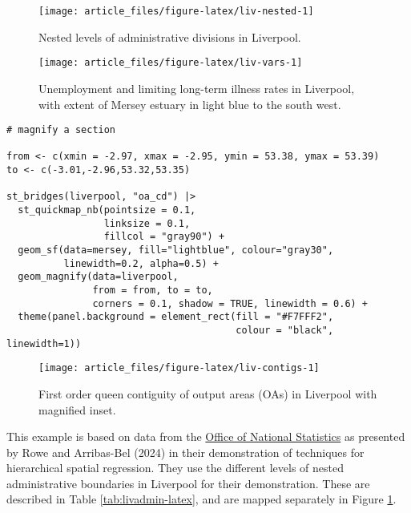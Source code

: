 \begin{figure}

{\centering \texttt{[image: article\_files/figure-latex/liv-nested-1]} 

}

\caption{Nested levels of administrative divisions in Liverpool. }\label{fig:liv-nested}
\end{figure}

\begin{figure}

{\centering \texttt{[image: article\_files/figure-latex/liv-vars-1]} 

}

\caption{Unemployment and limiting long-term illness rates in Liverpool, with extent of Mersey estuary in light blue to the south west. }\label{fig:liv-vars}
\end{figure}

\begin{verbatim}
# magnify a section

from <- c(xmin = -2.97, xmax = -2.95, ymin = 53.38, ymax = 53.39)
to <- c(-3.01,-2.96,53.32,53.35)

st_bridges(liverpool, "oa_cd") |> 
  st_quickmap_nb(pointsize = 0.1,
                 linksize = 0.1,
                 fillcol = "gray90") +  
  geom_sf(data=mersey, fill="lightblue", colour="gray30", 
          linewidth=0.2, alpha=0.5) + 
  geom_magnify(data=liverpool, 
               from = from, to = to, 
               corners = 0.1, shadow = TRUE, linewidth = 0.6) + 
  theme(panel.background = element_rect(fill = "#F7FFF2",
                                        colour = "black", linewidth=1))
\end{verbatim}

\begin{figure}

{\centering \texttt{[image: article\_files/figure-latex/liv-contigs-1]} 

}

\caption{First order queen contiguity of output areas (OAs) in Liverpool with magnified inset. }\label{fig:liv-contigs}
\end{figure}

This example is based on data from the \href{https://www.nomisweb.co.uk/home/census2001.asp}{Office of National Statistics} as presented by Rowe and Arribas-Bel (2024) in their demonstration of techniques for hierarchical spatial regression. They use the different levels of nested administrative boundaries in Liverpool for their demonstration. These are described in Table \ref{tab:livadmin-latex}, and are mapped separately in Figure \ref{fig:liv-nested}.

